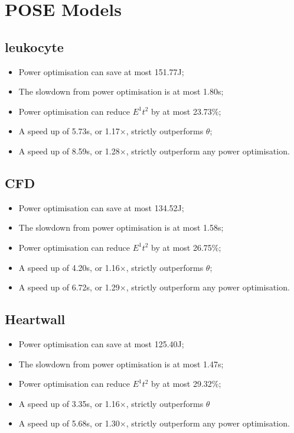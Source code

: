 \section{POSE Models}
\label{sec:appendix}
\subsection{leukocyte}
\begin{itemize}
  \item Power optimisation can save at most 151.77J;
  \item The slowdown from power optimisation is at most 1.80s;
  \item Power optimisation can reduce $E^1t^2$ by at most 23.73\%;
  \item A speed up of 5.73s, or 1.17$\times$, strictly outperforms $\theta$;
  \item A speed up of 8.59s, or 1.28$\times$, strictly outperform any power optimisation.
\end{itemize}

\subsection{CFD}
\begin{itemize}
  \item Power optimisation can save at most 134.52J;
  \item The slowdown from power optimisation is at most 1.58s;
  \item Power optimisation can reduce $E^1t^2$ by at most 26.75\%;
  \item A speed up of 4.20s, or 1.16$\times$, strictly outperforms $\theta$;
  \item A speed up of 6.72s, or 1.29$\times$, strictly outperform any power optimisation.
\end{itemize}

\subsection{Heartwall}
\begin{itemize}
  \item Power optimisation can save at most 125.40J;
  \item The slowdown from power optimisation is at most 1.47s;
  \item Power optimisation can reduce $E^1t^2$ by at most 29.32\%;
  \item A speed up of 3.35s, or 1.16$\times$, strictly outperforms $\theta$
  \item A speed up of 5.68s, or 1.30$\times$, strictly outperform any power optimisation.
\end{itemize}

